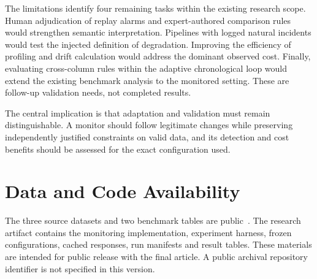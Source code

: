 The limitations identify four remaining tasks within the existing research scope. Human adjudication of replay alarms and expert-authored comparison rules would strengthen semantic interpretation. Pipelines with logged natural incidents would test the injected definition of degradation. Improving the efficiency of profiling and drift calculation would address the dominant observed cost. Finally, evaluating cross-column rules within the adaptive chronological loop would extend the existing benchmark analysis to the monitored setting. These are follow-up validation needs, not completed results.

The central implication is that adaptation and validation must remain distinguishable. A monitor should follow legitimate changes while preserving independently justified constraints on valid data, and its detection and cost benefits should be assessed for the exact configuration used.

\section*{Data and Code Availability}
The three source datasets and two benchmark tables are public~\cite{BTS2024,Chen2019,Chicago2026,Mahdavi2019}. The research artifact contains the monitoring implementation, experiment harness, frozen configurations, cached responses, run manifests and result tables. These materials are intended for public release with the final article. A public archival repository identifier is not specified in this version.
